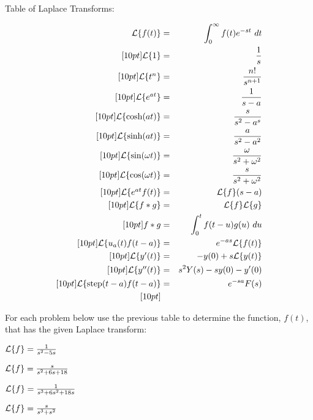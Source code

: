 \begin{problem}
Table of Laplace Transforms:

\begin{eqnarray*}
  \laplace{f(t)}  & = & \int^\infty_0 f(t) e^{-st} ~ dt \\ [10pt]
  \laplace{1}      & = & \frac{1}{s} \\ [10pt]
  \laplace{t^n}    & = & \frac{n!}{s^{n+1}} \\ [10pt]
  \laplace{e^{at}} & = & \frac{1}{s-a} \\ [10pt]
  \laplace{\cosh(at)} & = & \frac{s}{s^2-a^s} \\ [10pt]
  \laplace{\sinh(at)} & = & \frac{a}{s^2-a^2} \\ [10pt]
  \laplace{\sin(\omega t)} & = & \frac{\omega}{s^2+\omega^2} \\ [10pt]
  \laplace{\cos(\omega t)} & = & \frac{s}{s^2+\omega^2} \\ [10pt]
  \laplace{e^{at}f(t)} & = & \laplace{f}(s-a) \\ [10pt]
  \laplace{f*g} & = & \laplace{f}\laplace{g} \\ [10pt]
  f*g & = & \int^t_0 f(t-u) g(u) ~ du \\ [10pt]
  \laplace{u_a(t) f(t-a)} & = & e^{-as} \laplace{f(t)} \\ [10pt]
  \laplace{y'(t)} & = & -y(0) + s \laplace{y(t)} \\ [10pt]
  \laplace{y''(t)}& = & s^2 Y(s) - sy(0) - y'(0) \\ [10pt]
  \laplace{\mathrm{step}(t-a)f(t-a)} & = & e^{-sa}F(s) \\ [10pt]
\end{eqnarray*}



\item For each problem below use the previous table to determine the
  function, $f(t)$, that has the given Laplace transform:

  \begin{subproblem}
    \item $\laplace{f}  =  \frac{1}{s^2-5s}$
      \vfill

    \item $\laplace{f}  =  \frac{s}{s^2+6s+18}$
      \vfill


    \item $\laplace{f}  =  \frac{1}{s^3+6s^2+18s}$
      \vfill


    \item $\laplace{f}  =  \frac{s}{s^3+s^2}$
      \vfill

  \end{subproblem}


\end{problem}

